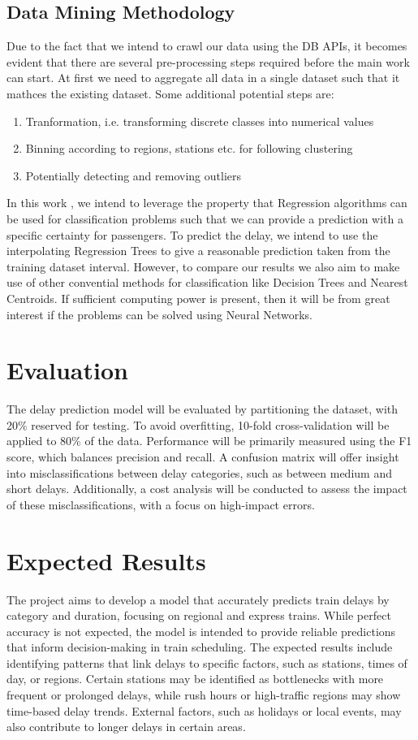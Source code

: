 \documentclass[a4paper,oneside,bibliography=totoc]{scrbook}
\begin{document}
\section{Data Mining Methodology}\label{sec:data-mining-methodology}
Due to the fact that we intend to crawl our data using the DB APIs, it becomes evident that there are several pre-processing steps required before the main work can start. At first we need to aggregate all data in a single dataset such that it mathces the existing dataset.
Some additional potential steps are:
\begin{enumerate}
    \item Tranformation, i.e. transforming discrete classes into numerical values
    \item Binning according to regions, stations etc. for following clustering
    \item Potentially detecting and removing outliers
\end{enumerate}
In this work , we intend to leverage the property that Regression algorithms can be used for classification problems such that we can provide a prediction with a specific certainty for passengers. To predict the delay, we intend to
use the interpolating Regression Trees to give a reasonable prediction taken from the training dataset interval. However, to compare our results we also aim to make use of other convential methods for classification like Decision Trees and Nearest Centroids.
If sufficient computing power is present, then it will be from great interest if the problems can be solved using Neural Networks.

\chapter{Evaluation}\label{ch:eval}
The delay prediction model will be evaluated by partitioning the dataset, with 20\% reserved for testing.
To avoid overfitting, 10-fold cross-validation will be applied to 80\% of the data.
Performance will be primarily measured using the F1 score, which balances precision and recall.
A confusion matrix will offer insight into misclassifications between delay categories,
such as between medium and short delays.
Additionally, a cost analysis will be conducted to assess the impact of these misclassifications,
with a focus on high-impact errors.

\chapter{Expected Results}\label{sec:expected_results}
The project aims to develop a model that accurately predicts train delays by category and duration, focusing on regional and express trains.
While perfect accuracy is not expected, the model is intended to provide reliable predictions that inform decision-making in train scheduling.
The expected results include identifying patterns that link delays to specific factors, such as stations, times of day, or regions.
Certain stations may be identified as bottlenecks with more frequent or prolonged delays, while rush hours or high-traffic regions may show time-based delay trends.
External factors, such as holidays or local events, may also contribute to longer delays in certain areas.
\end{document}
